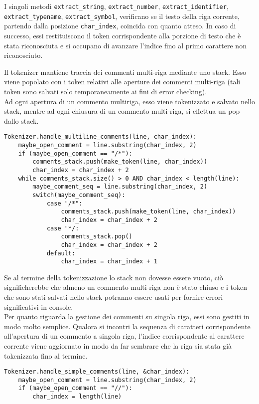 I singoli metodi \texttt{extract\_string}, \texttt{extract\_number}, 
\texttt{extract\_identifier}, \texttt{extract\_typename}, 
\texttt{extract\_symbol}, verificano se il testo della riga corrente, 
partendo dalla posizione \texttt{char\_index}, coincida con quanto 
atteso. In caso di successo, essi restituiscono il token corrispondente 
alla porzione di testo che è stata riconosciuta e si occupano di 
avanzare l'indice fino al primo carattere non riconosciuto. 

\newpage

Il tokenizer mantiene traccia dei commenti multi-riga mediante uno 
stack. Esso viene popolato con i token relativi alle aperture dei 
commenti multi-riga (tali token sono salvati solo temporaneamente ai 
fini di error checking). \\

Ad ogni apertura di un commento multiriga, esso viene tokenizzato 
e salvato nello stack, mentre ad ogni chiusura di un commento multi-riga, 
si effettua un pop dallo stack. \\


\vspace{0.5cm}
\begin{lstlisting}[frame=single]
Tokenizer.handle_multiline_comments(line, char_index):
    maybe_open_comment = line.substring(char_index, 2)
    if (maybe_open_comment == "/*"):
        comments_stack.push(make_token(line, char_index))
        char_index = char_index + 2
    while comments_stack.size() > 0 AND char_index < length(line):
        maybe_comment_seq = line.substring(char_index, 2)
        switch(maybe_comment_seq):
            case "/*": 
                comments_stack.push(make_token(line, char_index))
                char_index = char_index + 2
            case "*/:
                comments_stack.pop()
                char_index = char_index + 2
            default:
                char_index = char_index + 1
\end{lstlisting}    
\vspace{0.5cm}

Se al termine della tokenizzazione lo stack non dovesse essere vuoto, 
ciò significherebbe che almeno un commento multi-riga non è stato chiuso 
e i token che sono stati salvati nello stack potranno essere usati 
per fornire errori significativi in console. \\

Per quanto riguarda la gestione dei commenti su singola riga, essi 
sono gestiti in modo molto semplice. Qualora si incontri la sequenza
di caratteri corrispondente all'apertura di un commento a singola riga, 
l'indice corrispondente al carattere corrente viene aggiornato 
in modo da far sembrare che la riga sia stata già tokenizzata fino al termine.


\vspace{0.5cm}
\begin{lstlisting}[frame=single]
Tokenizer.handle_simple_comments(line, &char_index):
    maybe_open_comment = line.substring(char_index, 2)
    if (maybe_open_comment == "//"):
        char_index = length(line)
\end{lstlisting}    
\vspace{0.5cm}